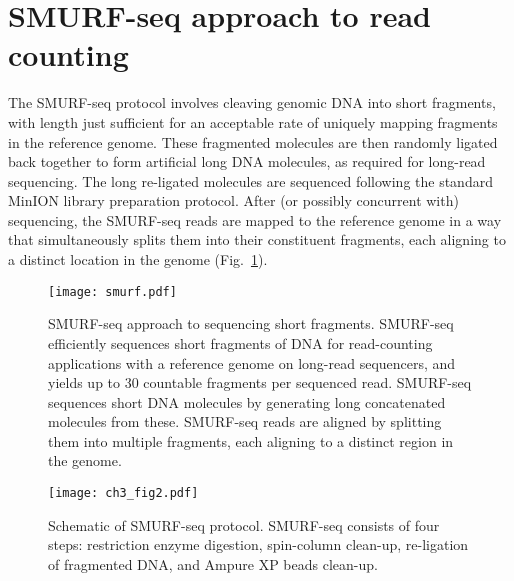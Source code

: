 \section{SMURF-seq approach to read counting}
The SMURF-seq protocol involves cleaving genomic DNA into short
fragments, with length just sufficient for an acceptable rate of
uniquely mapping fragments in the reference genome.  These fragmented
molecules are then randomly ligated back together to form artificial
long DNA molecules, as required for long-read sequencing. The long
re-ligated molecules are sequenced following the standard MinION library
preparation protocol. After (or possibly concurrent with) sequencing,
the SMURF-seq reads are mapped to the reference genome in a way that
simultaneously splits them into their constituent fragments, each
aligning to a distinct location in the genome (Fig.~\ref{smurf}).

\begin{figure}[b!]
\centering
\texttt{[image: smurf.pdf]}
\caption[SMURF-seq approach to sequencing short fragments]{
  SMURF-seq approach to sequencing short fragments.
  SMURF-seq efficiently sequences short fragments of DNA for
  read-counting applications with a reference genome on long-read
  sequencers, and yields up to 30 countable fragments per sequenced read.
  SMURF-seq sequences short DNA molecules by generating long concatenated
  molecules from these.  SMURF-seq reads are aligned by splitting them
  into multiple fragments, each aligning to a distinct region in the
  genome.}
\label{smurf}
\end{figure}


\begin{figure}[t!]
\centering
\texttt{[image: ch3\_fig2.pdf]}
\caption[Schematic of SMURF-seq protocol]{
  Schematic of SMURF-seq protocol. SMURF-seq consists of four
  steps: restriction enzyme digestion, spin-column clean-up, re-ligation
  of fragmented DNA, and Ampure XP beads clean-up.}
\label{protocol}
\end{figure}

